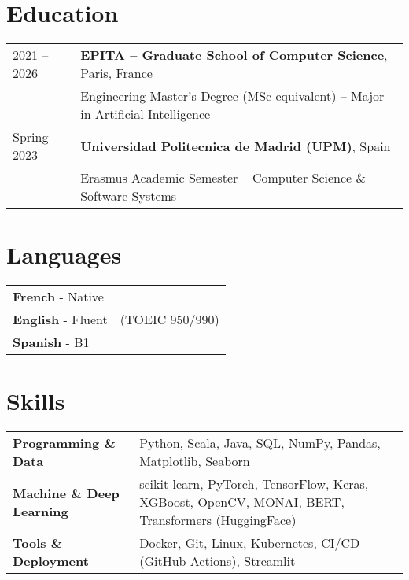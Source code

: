 \documentclass[a4paper,12pt]{article}
\begin{document}
\section{Education}
\begin{tabularx}{\linewidth}{@{}l X@{}}	
2021 – 2026 & \textbf{EPITA – Graduate School of Computer Science}, Paris, France \\
            & Engineering Master’s Degree (MSc equivalent) – Major in Artificial Intelligence \\[0.6em]

Spring 2023 & \textbf{Universidad Politecnica de Madrid (UPM)}, Spain \\
            & Erasmus Academic Semester – Computer Science \& Software Systems \\
\end{tabularx}


\section{Languages}
\begin{tabularx}{\linewidth}{@{}l X@{}}	
\textbf{French} - Native\\

\textbf{English} - Fluent & \hfill \normalsize (TOEIC 950/990) \\

\textbf{Spanish} - B1 \\

\end{tabularx}

\section{Skills}
\begin{tabularx}{\linewidth}{@{}l X@{}}

\textbf{Programming \& Data} & Python, Scala, Java, SQL, NumPy, Pandas, Matplotlib, Seaborn \\

\textbf{Machine \& Deep Learning} & scikit-learn, PyTorch, TensorFlow, Keras, XGBoost, OpenCV, MONAI, BERT, Transformers (HuggingFace) \\

\textbf{Tools \& Deployment} & Docker, Git, Linux, Kubernetes, CI/CD (GitHub Actions), Streamlit \\

\end{tabularx}
\end{document}
